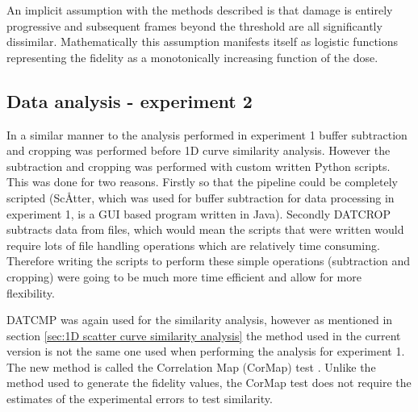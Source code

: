 An implicit assumption with the methods described is that damage is entirely progressive and subsequent frames beyond the threshold are all significantly dissimilar.
Mathematically this assumption manifests itself as logistic functions representing the fidelity as a monotonically increasing function of the dose.

\subsection{Data analysis - experiment 2}
\label{sub:Data analysis - experiment 2}
In a similar manner to the analysis performed in experiment 1 buffer subtraction and cropping was performed before 1D curve similarity analysis.
However the subtraction and cropping was performed with custom written Python scripts.
This was done for two reasons.
Firstly so that the pipeline could be completely scripted (Sc\AA tter, which was used for buffer subtraction for data processing in experiment 1, is a GUI based program written in Java).
Secondly DATCROP subtracts data from files, which would mean the scripts that were written would require lots of file handling operations which are relatively time consuming.
Therefore writing the scripts to perform these simple operations (subtraction and cropping) were going to be much more time efficient and allow for more flexibility.

DATCMP was again used for the similarity analysis, however as mentioned in section \ref{sec:1D scatter curve similarity analysis} the method used in the current version is not the same one used when performing the analysis for experiment 1.
The new method is called the Correlation Map (CorMap) test \cite{franke2015correlation}.
Unlike the method used to generate the fidelity values, the CorMap test does not require the estimates of the experimental errors to test similarity.

